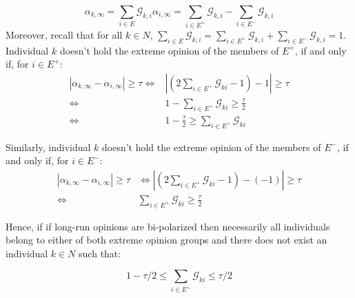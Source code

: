 \documentclass{article}
\begin{document}
$$ \alpha_{k,\infty } = \sum_{i \in E} \mathcal{G}_{k,i} \alpha_{i,\infty} = \sum_{i \in E^{+}} \mathcal{G}_{k,i} -  \sum_{i \in E^{-}} \mathcal{G}_{k,i} $$
Moreover, recall that for all $k \in N$, $ \sum_{i \in E} \mathcal{G}_{k,i} = \sum_{i \in E^{+}} \mathcal{G}_{k,i} +  \sum_{i \in E^{-}} \mathcal{G}_{k,i} =1$.  Individual $k$ doesn't hold the extreme opinion of the members of $E^{+}$, if and only if, for $i \in E^{+}$:
\begin{align*}
 |\alpha_{k,\infty} - \alpha_{i, \infty}| \geq \tau \Leftrightarrow  & | (2 \sum_{i \in E^{+}} \mathcal{G}_{ki} -1) - 1 | \geq \tau \\
\Leftrightarrow &  1 - \sum_{i \in E^{+}} \mathcal{G}_{ki} \geq \frac{\tau}{2} \\
\Leftrightarrow &  1 - \frac{\tau}{2} \geq  \sum_{i \in E^{+}} \mathcal{G}_{ki} \end{align*}

\noindent Similarly, individual $k$ doesn't hold the extreme opinion of the members of $E^{-}$, if and only if, for $i \in E^{-}$:
\begin{align*}
 |\alpha_{k,\infty} - \alpha_{i, \infty}| \geq \tau & \Leftrightarrow   | (2 \sum_{i \in E^{+}} \mathcal{G}_{ki} -1) -  (-1) | \geq \tau \\
\Leftrightarrow &  \sum_{i \in E^{+}} \mathcal{G}_{ki} \geq \frac{\tau}{2} 
\end{align*}

\noindent Hence, if if long-run opinions are bi-polarized then necessarily all individuals belong to either of both extreme opinion groups and there does not exist an individual $k \in N$ such that: 

$$1 - \tau/2 \leq \sum_{i \in E^{+}} \mathcal{G}_{ki} \leq \tau/2$$
\end{document}
